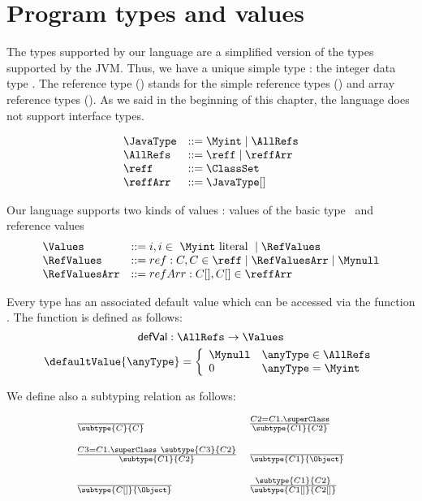 
\section{Program types and values}\label{types}
 The types supported by our language are a simplified version
 of the types supported by the JVM.
 Thus, we have a unique simple type : the integer data type \Myint.
 The reference type (\AllRefs) stands for the simple reference types ()
 and array reference types ().
 As we said in the beginning of this chapter, the language does not support interface types.

 
$$ \begin{array}{ll}
          \JavaType & ::= \Myint \mid \AllRefs\\
          \AllRefs  & ::= \reff \mid \reffArr \\
	  \reff     & ::= \ClassSet \\
	  \reffArr  & ::= \JavaType[]	  
   \end{array}  $$


Our language supports two kinds of values : values of the basic type \Myint  \ and reference values
$$ \begin{array}{ll}
             \Values &       ::= i, i \in \  \Myint \  \mbox{\rm literal } \mid \RefValues \\
	     \RefValues &    ::= ref: C , C \in \reff \mid \RefValuesArr  \mid   \Mynull \\
	     \RefValuesArr & ::= refArr   : C\lbrack \rbrack,  C\lbrack \rbrack \in \reffArr
  \end{array} $$



Every type has an associated default value which can be accessed via
the function . The function is defined as follows:
$$\mbox{\rm\textsf{defVal}} :   \AllRefs    \rightarrow   \Values $$
$$ \defaultValue{\anyType} = 
           \left\{\begin{array}{ll}
	      \Mynull & \anyType \in \AllRefs  \\
	       0 &  \anyType = \Myint
	    \end{array}\right. $$

We define also a subtyping relation as follows:

$$\begin{array}{ll}
  \frac{}{ \subtype{C}{C}} &  
  \frac{   C2 = C1.\superClass  }{\subtype{C1}{C2}} \\  
  & \\
  \frac{ C3 = C1.\superClass \   \subtype{C3}{C2} }{ \subtype{C1}{C2} } &
  \frac{}{  \subtype{C1}{\Object}} \\
  & \\
  \frac{   }{\subtype{C[]}{\Object}} &  
  \frac{ \subtype{C1}{C2}}{\subtype{C1[]}{C2[]}} \\
  \end{array}$$
